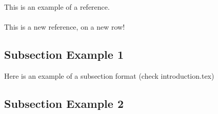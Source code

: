 This is an example of a reference. \cite[chapter 5.1,p~65]{testRef} 
\\\\
This is a new reference, on a new row! \cite{OwenPSP}

\subsection{Subsection Example 1} %
\label{sub:subsection_example_1}
	Here is an example of a subsection format (check introduction.tex)

\subsection{Subsection Example 2} %
\label{sub:subsection_example_2}
	
